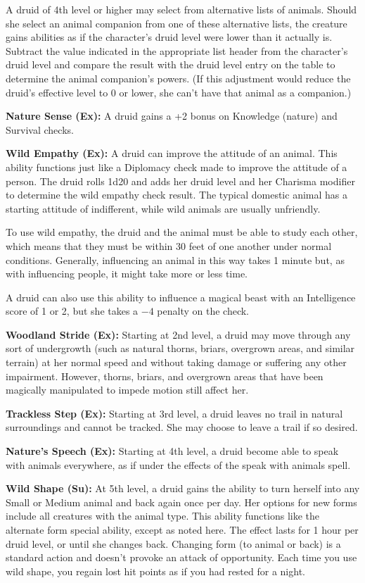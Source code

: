 A druid of 4th level or higher may select from alternative lists of animals. Should she select an animal companion from one of these alternative lists, the creature gains abilities as if the character's druid level were lower than it actually is. Subtract the value indicated in the appropriate list header from the character's druid level and compare the result with the druid level entry on the table to determine the animal companion's powers. (If this adjustment would reduce the druid's effective level to 0 or lower, she can't have that animal as a companion.)

\textbf{Nature Sense (Ex):} A druid gains a +2 bonus on Knowledge (nature) and Survival checks.

\textbf{Wild Empathy (Ex):} A druid can improve the attitude of an animal. This ability functions just like a Diplomacy check made to improve the attitude of a person. The druid rolls 1d20 and adds her druid level and her Charisma modifier to determine the wild empathy check result. The typical domestic animal has a starting attitude of indifferent, while wild animals are usually unfriendly.

To use wild empathy, the druid and the animal must be able to study each other, which means that they must be within 30 feet of one another under normal conditions. Generally, influencing an animal in this way takes 1 minute but, as with influencing people, it might take more or less time.

A druid can also use this ability to influence a magical beast with an Intelligence score of 1 or 2, but she takes a $-4$ penalty on the check.

\textbf{Woodland Stride (Ex):} Starting at 2nd level, a druid may move through any sort of undergrowth (such as natural thorns, briars, overgrown areas, and similar terrain) at her normal speed and without taking damage or suffering any other impairment. However, thorns, briars, and overgrown areas that have been magically manipulated to impede motion still affect her.

\textbf{Trackless Step (Ex):} Starting at 3rd level, a druid leaves no trail in natural surroundings and cannot be tracked. She may choose to leave a trail if so desired.

\textbf{Nature's Speech (Ex):} Starting at 4th level, a druid become able to speak with animals everywhere, as if under the effects of the speak with animals spell.


\textbf{Wild Shape (Su):} At 5th level, a druid gains the ability to turn herself into any Small or Medium animal and back again once per day. Her options for new forms include all creatures with the animal type. This ability functions like the alternate form special ability, except as noted here. The effect lasts for 1 hour per druid level, or until she changes back. Changing form (to animal or back) is a standard action and doesn't provoke an attack of opportunity. Each time you use wild shape, you regain lost hit points as if you had rested for a night.

